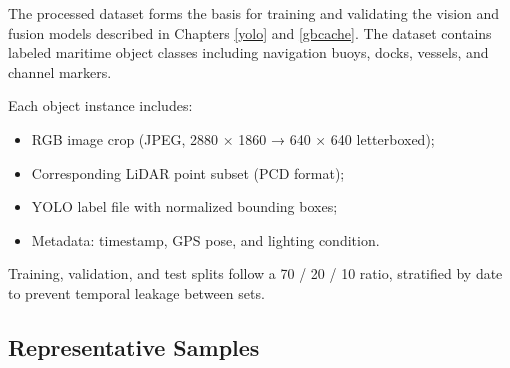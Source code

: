 \documentclass{erauthesis}
\begin{document}
The processed dataset forms the basis for training and validating the vision and fusion models described in Chapters \ref{yolo} and \ref{gbcache}.  
The dataset contains labeled maritime object classes including navigation buoys, docks, vessels, and channel markers.  

Each object instance includes:
\begin{itemize}[noitemsep,leftmargin=1.5em]
    \item RGB image crop (JPEG, 2880 × 1860 → 640 × 640 letterboxed);
    \item Corresponding LiDAR point subset (PCD format);
    \item YOLO label file with normalized bounding boxes;
    \item Metadata: timestamp, GPS pose, and lighting condition.
\end{itemize}

Training, validation, and test splits follow a 70 / 20 / 10 ratio, stratified by date to prevent temporal leakage between sets.  



\subsection{Representative Samples}
\label{sec:dataset_samples}



\end{document}
